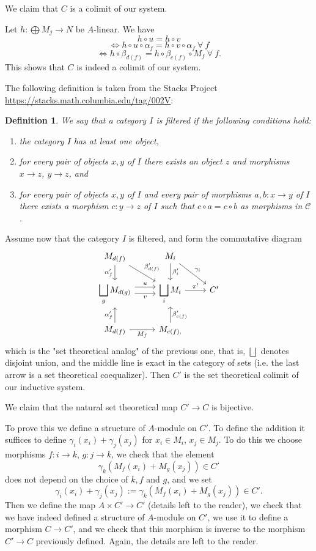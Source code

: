 \documentclass[parskip=half,fontsize=12pt]{scrartcl}%
\newcommand{\ds}{\displaystyle}
\newtheorem{df}[thm]{Definition}
\begin{document}
We claim that $C$ is a colimit of our system. %

Let $h:\bigoplus M_j\to N$ be $A$-linear. We have 
$$
h\circ u=h\circ v
$$ 
$$
\iff h\circ u\circ\alpha_f=h\circ v\circ\alpha_f\ \forall\ f
$$ 
$$
\iff h\circ\beta_{d(f)}=h\circ\beta_{c(f)}\circ M_f\ \forall\ f.
$$ 
This shows that $C$ is indeed a colimit of our system.

The following definition is taken from the Stacks Project\\ \href{https://stacks.math.columbia.edu/tag/002V}{https://stacks.math.columbia.edu/tag/002V}:

\begin{df}
We say that a category $I$ is \emph{filtered} if the following conditions hold:
\begin{enumerate}
\item the category $I$ has at least one object,
\item for every pair of objects $x, y$ of $I$ there exists an object $z$ and morphisms $x \to z$, $y \to z$, and
\item for every pair of objects $x, y$ of $I$ and every pair of morphisms $a, b : x \to y$ of $I$ there exists a morphism $c : y \to z$ of $I$ such that $c \circ a=c\circ b$ as morphisms in $\mathcal{C}$.
\end{enumerate}
\end{df}

Assume now that the category $I$ is filtered, and form the commutative diagram %
$$
\begin{tikzcd}
M_{d(f)}\ar[d,"\alpha'_{f}"']\ar[dr,"\beta'_{d(f)}"]&M_i\ar[d,"\beta'_i"]\ar[dr,"\gamma_i"]\\ 
\ds\bigsqcup_gM_{d(g)}\ar[r,yshift=0.9ex,"u"]\ar[r,yshift=-0.9ex,"v"']&\ds\bigsqcup_iM_i\ar[r,"\pi'"]&C'\\ 
M_{d(f)}\ar[u,"\alpha'_{f}"]\ar[r,"M_f"']&M_{c(f),}\ar[u,"\beta'_{c(f)}"']
\end{tikzcd}
$$ 
which is the "set theoretical analog" of the previous one, that is, $\bigsqcup$ denotes disjoint union, and the middle line is exact in the category of sets (i.e. the last arrow is a set theoretical coequalizer). Then $C'$ is the set theoretical colimit of our inductive system. 

We claim that the natural set theoretical map $C'\to C$ is bijective. 

To prove this we define a structure of $A$-module on $C'$. To define the addition it suffices to define $\gamma_i(x_i)+\gamma_j(x_j)$ for $x_i\in M_i$, $x_j\in M_j$. To do this we choose morphisms $f:i\to k$, $g:j\to k$, we check that the element 
$$
\gamma_k(M_f(x_i)+M_g(x_j))\in C'
$$ 
does not depend on the choice of $k,f$ and $g$, and we set 
$$
\gamma_i(x_i)+\gamma_j(x_j):=\gamma_k(M_f(x_i)+M_g(x_j))\in C'.
$$ 
Then we define the map $A\times C'\to C'$ (details left to the reader), we check that we have indeed defined a structure of $A$-module on $C'$, we use it to define a morphism $C\to C'$, and we check that this morphism is inverse to the morphism $C'\to C$ previously defined. Again, the details are left to the reader. 
\end{document}
